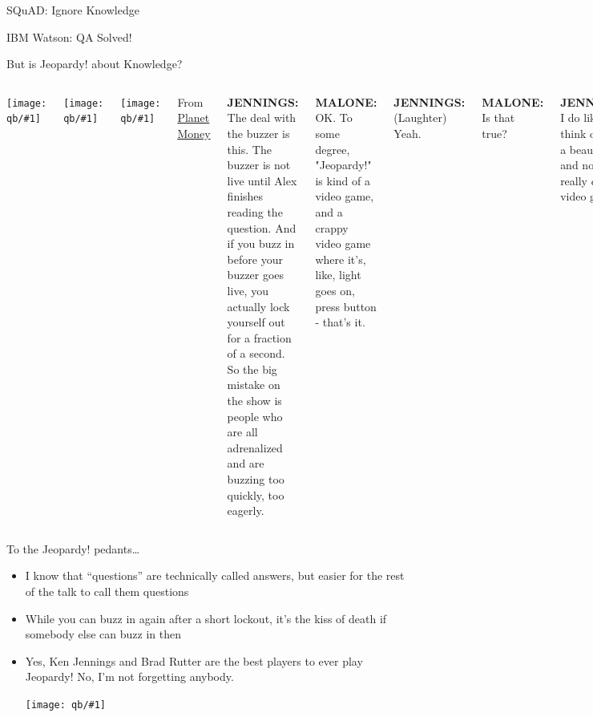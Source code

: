 \documentclass[xcolor=dvipsnames]{beamer}
\newcommand{\fsi}[2]{
\begin{frame}[plain]
\vspace*{-1pt}
\makebox[\linewidth]{\texttt{[image: \#1]}}
\begin{center}
#2
\end{center}
\end{frame}
}
\newcommand{\gfxq}[2]{
\begin{center}
	\texttt{[image: qb/\#1]}
\end{center}
}
\begin{document}
\fsi{qb/human_reading}{SQuAD: Ignore Knowledge}

\fsi{qb/jeopardy}{IBM Watson: QA Solved!}


\begin{frame}{But is Jeopardy! about Knowledge?}

  \begin{columns}
    \gfxq{planet_money}{.75}
    \gfxq{jennings}{.7}  
    \gfxq{kenny_malone}{.7}

    From \href{file:///Users/jbg/repositories/jbg-talks/qb/jennings-buzzer.mp3}{Planet Money} \\
    
    \small

    {\bf JENNINGS:} The deal with the buzzer is this. The buzzer is
    not live until Alex finishes reading the question. And if you buzz
    in before your buzzer goes live, \alert<1>{you actually lock yourself out
    for a fraction of a second}. So the big mistake on the show is
    people who are all adrenalized and are buzzing too quickly, too
    eagerly.

    \pause

    {\bf MALONE:} OK. To some degree, "Jeopardy!" is kind of a video game, and a \alert<2>{crappy video game where it's, like, light goes on, press button} - that's it.

    \pause
    
    {\bf JENNINGS:} (Laughter) Yeah.

    {\bf MALONE:} Is that true?

    {\bf JENNINGS:} I do like to think of it as a \alert<3>{beautiful art} and not a really crappy video game.
    
  \end{columns}
  
\end{frame}


\begin{frame}{To the Jeopardy! pedants\dots}

  \begin{itemize}
  \item I know that ``questions'' are technically called answers, but
    easier for the rest of the talk to call them questions
  \item While you can buzz in again after a short lockout, it's the
    kiss of death if somebody else can buzz in then
  \item Yes, Ken Jennings and Brad Rutter are the best players to ever play Jeopardy!
    No, I'm not forgetting anybody.

    \gfxq{holzhauer}{.5}
    
  \end{itemize}

\end{frame}
\end{document}
